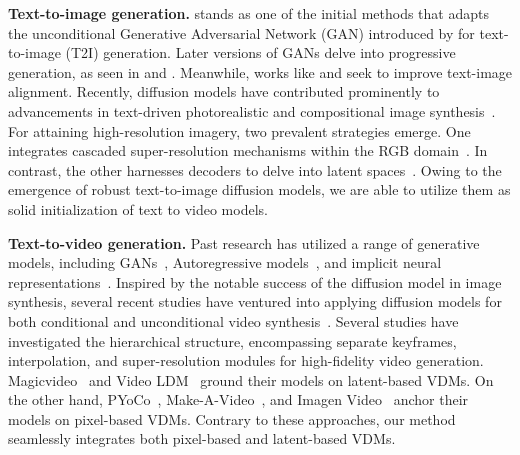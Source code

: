 \documentclass{article} \usepackage{iclr2024_conference,times}
\begin{document}
\noindent\textbf{Text-to-image generation.} \citep{reed2016generative} stands as one of the initial methods that adapts the unconditional Generative Adversarial Network (GAN) introduced by \citep{goodfellow2014generative} for text-to-image (T2I) generation. Later versions of GANs delve into progressive generation, as seen in \citep{zhang2017stackgan} and \citep{hong2018inferring}. Meanwhile, works like \citep{xu2018attngan} and \citep{zhang2021cross} seek to improve text-image alignment. Recently, diffusion models have contributed prominently to advancements in text-driven photorealistic and compositional image synthesis~\citep{ramesh2022hierarchical,saharia2022photorealistic}.   For attaining high-resolution imagery, two prevalent strategies emerge. One integrates cascaded super-resolution mechanisms within the RGB domain~\citep{nichol2021glide,ho2022cascaded,saharia2022photorealistic,ramesh2022hierarchical}. In contrast, the other harnesses decoders to delve into latent spaces~\citep{rombach2022high,gu2022vector}.  Owing to the emergence of robust text-to-image diffusion models, we are able to utilize them as solid initialization
 of text to video models.
 
\noindent\textbf{Text-to-video generation.} 
Past research has utilized a range of generative models, including GANs~\citep{vondrick2016generating,saito2017temporal,Tulyakov_2018_CVPR,tian2021a,Shen_2023_CVPR}, Autoregressive models~\citep{srivastava2015unsupervised,yan2021videogpt,le2021ccvs,ge2022long,hong2022cogvideo}, and implicit neural representations~\citep{skorokhodov2021stylegan,yu2021generating}. Inspired by the notable success of the diffusion model in image synthesis, several recent studies have ventured into applying diffusion models for both conditional and unconditional video synthesis~\citep{voleti2022masked,harvey2022flexible,zhou2022magicvideo,wu2022tune,blattmann2023videoldm,khachatryan2023text2video,hoppe2022diffusion,voleti2022masked,yang2022diffusion,nikankin2022sinfusion,luo2023videofusion,an2023latent,wang2023videofactory}. Several studies have investigated the hierarchical structure, encompassing separate keyframes, interpolation, and super-resolution modules for high-fidelity video generation. Magicvideo~\citep{zhou2022magicvideo} and Video LDM~\citep{blattmann2023align} ground their models on latent-based VDMs. On the other hand, PYoCo~\citep{ge2023preserve}, Make-A-Video~\citep{singer2022make}, and Imagen Video~\citep{ho2022imagen} anchor their models on pixel-based VDMs. Contrary to these approaches, our method seamlessly integrates both pixel-based and latent-based VDMs.
\end{document}
